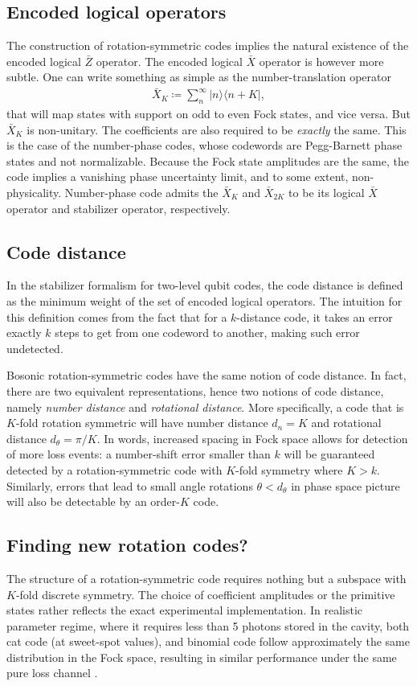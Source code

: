 \documentclass[%
 reprint,
superscriptaddress,
 amsmath,amssymb,
 aps,13pt
]{revtex4-2}
\begin{document}
\subsection{Encoded logical operators}
The construction of rotation-symmetric codes implies the natural existence of the encoded logical $\bar{Z}$ operator. The encoded logical $\bar{X}$ operator is however more subtle. One can write something as simple as the number-translation operator
\begin{align}
    \bar{X}_K \coloneqq \sum_{n}^\infty |n\rangle\langle n + K|,
\end{align}
that will map states with support on odd to even Fock states, and vice versa. But $\bar{X}_K$ is non-unitary. The coefficients are also required to be \textit{exactly} the same. This is the case of the number-phase codes, whose codewords are Pegg-Barnett phase states and not normalizable. Because the Fock state amplitudes are the same, the code implies a vanishing phase uncertainty limit, and to some extent, non-physicality. Number-phase code admits the $\bar{X}_K$ and $\bar{X}_{2K}$ to be its logical $\bar{X}$ operator and stabilizer operator, respectively. 
\subsection{Code distance}
In the stabilizer formalism for two-level qubit codes, the code distance is defined as the minimum weight of the set of encoded logical operators. The intuition for this definition comes from the fact that for a $k$-distance code, it takes an error exactly $k$ steps to get from one codeword to another, making such error undetected.

Bosonic rotation-symmetric codes have the same notion of code distance. In fact, there are two equivalent representations, hence two notions of code distance, namely \textit{number distance} and \textit{rotational distance}. More specifically, a code that is $K$-fold rotation symmetric will have number distance $d_n = K$ and rotational distance $d_\theta=\pi/K$. In words, increased spacing in Fock space allows for detection of more loss events: a number-shift error smaller than $k$ will be guaranteed detected by a rotation-symmetric code with $K$-fold symmetry where $K>k$. Similarly, errors that lead to small angle rotations $\theta < d_\theta$ in phase space picture will also be detectable by an order-$K$ code. 
\subsection{Finding new rotation codes?}
The structure of a rotation-symmetric code requires nothing but a subspace with $K$-fold discrete symmetry. The choice of coefficient amplitudes or the primitive states rather reflects the exact experimental implementation. In realistic parameter regime, where it requires less than 5 photons stored in the cavity, both cat code (at sweet-spot values), and binomial code follow approximately the same distribution in the Fock space, resulting in similar performance under the same pure loss channel \cite{performance_structure, rotation_symmetric}.
\end{document}
